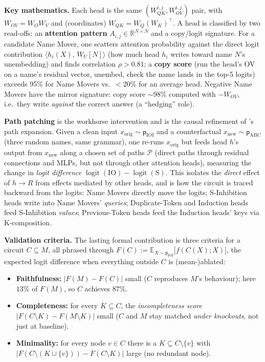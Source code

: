 \textbf{Key mathematics.} Each head is the same $(W_{QK}^{i,j}, W_{OV}^{i,j})$ pair, with $W_{OV}=W_O W_V$ and (coordinates) $W_{QK}=W_Q (W_K)^{\top}$. A head is classified by two read-offs: an \textbf{attention pattern} $A_{i,j}\in\mathbb{R}^{N\times N}$ and a copy/logit signature. For a candidate Name Mover, one scatters attention probability against the direct logit contribution $\langle h_i(X),\,W_U[N]\rangle$ (how much head $h_i$ writes toward name $N$'s unembedding) and finds correlation $\rho>0.81$; a \textbf{copy score} (run the head's OV on a name's residual vector, unembed, check the name lands in the top-5 logits) exceeds 95\% for Name Movers vs.\ $<$20\% for an average head. Negative Name Movers have the mirror signature: copy score $\sim$98\% computed with $-W_{OV}$, i.e.\ they write \emph{against} the correct answer (a ``hedging'' role).

\textbf{Path patching} is the workhorse intervention and is the causal refinement of \textcite{framework}'s path expansion. Given a clean input $x_{\mathrm{orig}}\sim\mathsf{p}_{\mathrm{IOI}}$ and a counterfactual $x_{\mathrm{new}}\sim\mathsf{p}_{\mathrm{ABC}}$ (three random names, same grammar), one re-runs $x_{\mathrm{orig}}$ but feeds head $h$'s output from $x_{\mathrm{new}}$ along a chosen set of paths $\mathcal{P}$ (direct paths through residual connections and MLPs, but not through other attention heads), measuring the change in \emph{logit difference} $\operatorname{logit}(\mathrm{IO})-\operatorname{logit}(\mathrm{S})$. This isolates the \emph{direct} effect of $h\to R$ from effects mediated by other heads, and is how the circuit is traced backward from the logits: Name Movers directly move the logits; S-Inhibition heads write into Name Movers' \emph{queries}; Duplicate-Token and Induction heads feed S-Inhibition \emph{values}; Previous-Token heads feed the Induction heads' keys via K-composition.

\textbf{Validation criteria.} The lasting formal contribution is three criteria for a circuit $C\subseteq M$, all phrased through $F(C):=\mathbb{E}_{X\sim\mathsf{p}_{\mathrm{IOI}}}\big[f(C(X);X)\big]$, the expected logit difference when everything outside $C$ is (mean-)ablated:
\begin{itemize}[leftmargin=1.4em]
\item \textbf{Faithfulness:} $|F(M)-F(C)|$ small ($C$ reproduces $M$'s behaviour); here $13\%$ of $F(M)$, so $C$ achieves $87\%$.
\item \textbf{Completeness:} for every $K\subseteq C$, the \emph{incompleteness score} $|F(C\setminus K)-F(M\setminus K)|$ small ($C$ and $M$ stay matched \emph{under knockouts}, not just at baseline).
\item \textbf{Minimality:} for every node $v\in C$ there is a $K\subseteq C\setminus\{v\}$ with $|F(C\setminus(K\cup\{v\}))-F(C\setminus K)|$ large (no redundant node).
\end{itemize}

